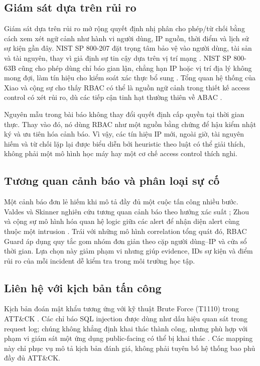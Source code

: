 \subsection{Giám sát dựa trên rủi ro}
\label{subsec:risk-monitoring}

Giám sát dựa trên rủi ro mở rộng quyết định nhị phân cho phép/từ chối bằng cách
xem xét ngữ cảnh như hành vi người dùng, IP nguồn, thời điểm và lịch sử sự kiện
gần đây. NIST SP 800-207 đặt trọng tâm bảo vệ vào người dùng, tài sản và tài
nguyên, thay vì giả định sự tin cậy dựa trên vị trí mạng \citep{Rose2020SP800207}.
NIST SP 800-63B cũng cho phép dùng chỉ báo gian lận, chẳng hạn IP hoặc vị trí
địa lý không mong đợi, làm tín hiệu cho kiểm soát xác thực bổ sung
\citep{NIST2025SP80063B}. Tổng quan hệ thống của Xiao và cộng sự cho thấy
RBAC có thể là nguồn ngữ cảnh trong thiết kế access control có xét rủi ro, dù
các tiếp cận tinh hạt thường thiên về ABAC \citep{Xiao2022ContextRisk}.

Nguyên mẫu trong bài báo không thay đổi quyết định cấp quyền tại thời gian thực.
Thay vào đó, nó dùng RBAC như một nguồn bằng chứng để hậu kiểm nhật ký và ưu
tiên hóa cảnh báo. Vì vậy, các tín hiệu IP mới, ngoài giờ, tài nguyên hiếm và
từ chối lặp lại được biểu diễn bởi heuristic theo luật có thể giải thích, không
phải một mô hình học máy hay một cơ chế access control thích nghi.

\subsection{Tương quan cảnh báo và phân loại sự cố}
\label{subsec:alert-correlation}

Một cảnh báo đơn lẻ hiếm khi mô tả đầy đủ một cuộc tấn công nhiều bước. Valdes
và Skinner nghiên cứu tương quan cảnh báo theo hướng xác suất
\citep{Valdes2001AlertCorrelation}; Zhou và cộng sự mô hình hóa quan hệ logic
giữa các alert để nhận diện alert cùng thuộc một intrusion
\citep{Zhou2007AlertCorrelation}. Trái với những mô hình correlation tổng quát
đó, RBAC Guard áp dụng quy tắc gom nhóm đơn giản theo cặp người dùng--IP và cửa
sổ thời gian. Lựa chọn này giảm phạm vi nhưng giúp evidence, IDs sự kiện và
điểm rủi ro của mỗi incident dễ kiểm tra trong môi trường học tập.

\subsection{Liên hệ với kịch bản tấn công}
\label{subsec:attack-scenarios}

Kịch bản đoán mật khẩu tương ứng với kỹ thuật Brute Force (T1110) trong ATT\&CK
\citep{MITRET1110}. Các chỉ báo SQL injection được dùng như dấu hiệu quan sát
trong request log; chúng không khẳng định khai thác thành công, nhưng phù hợp
với phạm vi giám sát một ứng dụng public-facing có thể bị khai thác
\citep{MITRET1190}. Các mapping này chỉ phục vụ mô tả kịch bản đánh giá, không
phải tuyên bố hệ thống bao phủ đầy đủ ATT\&CK.
